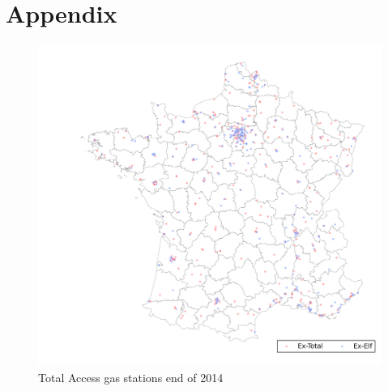 \documentclass[english]{article}
\begin{document}
\newpage



\newpage

\appendix

\section{Appendix}

\begin{figure}[H]
	\centering
		\includegraphics[width=16cm]{graphs/map_total_access.png}
	\floatfoot{}
\caption{Total Access gas stations end of 2014}
\label{figure:map_ta}
\end{figure}
\end{document}
